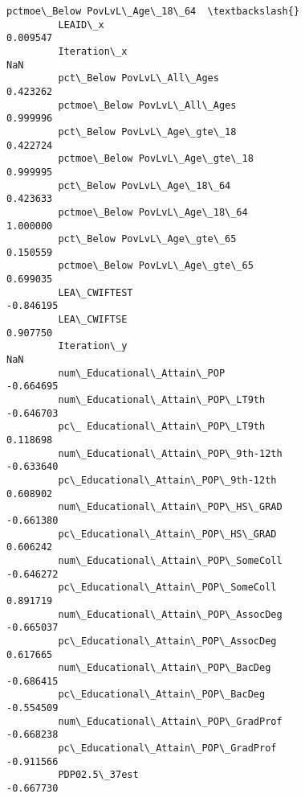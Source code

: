 \documentclass[11pt]{article}
\begin{document}
\begin{Verbatim}[commandchars=\\\{\}]
                                                    pctmoe\_Below PovLvL\_Age\_18\_64  \textbackslash{}
         LEAID\_x                                                         0.009547   
         Iteration\_x                                                          NaN   
         pct\_Below PovLvL\_All\_Ages                                       0.423262   
         pctmoe\_Below PovLvL\_All\_Ages                                    0.999996   
         pct\_Below PovLvL\_Age\_gte\_18                                     0.422724   
         pctmoe\_Below PovLvL\_Age\_gte\_18                                  0.999995   
         pct\_Below PovLvL\_Age\_18\_64                                      0.423633   
         pctmoe\_Below PovLvL\_Age\_18\_64                                   1.000000   
         pct\_Below PovLvL\_Age\_gte\_65                                     0.150559   
         pctmoe\_Below PovLvL\_Age\_gte\_65                                  0.699035   
         LEA\_CWIFTEST                                                   -0.846195   
         LEA\_CWIFTSE                                                     0.907750   
         Iteration\_y                                                          NaN   
         num\_Educational\_Attain\_POP                                     -0.664695   
         num\_Educational\_Attain\_POP\_LT9th                               -0.646703   
         pc\_ Educational\_Attain\_POP\_LT9th                                0.118698   
         num\_Educational\_Attain\_POP\_9th-12th                            -0.633640   
         pc\_Educational\_Attain\_POP\_9th-12th                              0.608902   
         num\_Educational\_Attain\_POP\_HS\_GRAD                             -0.661380   
         pc\_Educational\_Attain\_POP\_HS\_GRAD                               0.606242   
         num\_Educational\_Attain\_POP\_SomeColl                            -0.646272   
         pc\_Educational\_Attain\_POP\_SomeColl                              0.891719   
         num\_Educational\_Attain\_POP\_AssocDeg                            -0.665037   
         pc\_Educational\_Attain\_POP\_AssocDeg                              0.617665   
         num\_Educational\_Attain\_POP\_BacDeg                              -0.686415   
         pc\_Educational\_Attain\_POP\_BacDeg                               -0.554509   
         num\_Educational\_Attain\_POP\_GradProf                            -0.668238   
         pc\_Educational\_Attain\_POP\_GradProf                             -0.911566   
         PDP02.5\_37est                                                  -0.667730   

\end{Verbatim}
\end{document}
